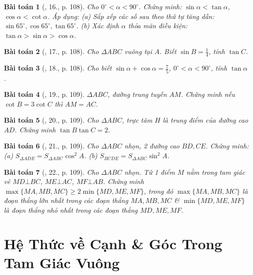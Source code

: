 \documentclass{article}
\newtheorem{baitoan}{Bài toán}
\begin{document}
\begin{baitoan}[\cite{Tuyen_Toan_9}, 16., p. 108]
	Cho $0^\circ < \alpha < 90^\circ$. Chứng minh: $\sin\alpha < \tan\alpha$, $\cos\alpha < \cot\alpha$. Áp dụng: (a) Sắp xếp các số sau theo thứ tự tăng dần: $\sin 65^\circ,\cos 65^\circ,\tan 65^\circ$. (b) Xác định $\alpha$ thỏa mãn điều kiện: $\tan\alpha > \sin\alpha > \cos\alpha$.
\end{baitoan}

\begin{baitoan}[\cite{Tuyen_Toan_9}, 17., p. 108]
	Cho $\Delta ABC$ vuông tại $A$. Biết $\sin B = \frac{1}{4}$, tính $\tan C$.
\end{baitoan}

\begin{baitoan}[\cite{Tuyen_Toan_9}, 18., p. 108]
	Cho biết $\sin\alpha + \cos\alpha = \frac{7}{5}$, $0^\circ < \alpha < 90^\circ$, tính $\tan\alpha$.
\end{baitoan}

\begin{baitoan}[\cite{Tuyen_Toan_9}, 19., p. 109]
	$\Delta ABC$, đường trung tuyến $AM$. Chứng minh nếu $\cot B = 3\cot C$ thì $AM = AC$.
\end{baitoan}

\begin{baitoan}[\cite{Tuyen_Toan_9}, 20., p. 109]
	Cho $\Delta ABC$, trực tâm $H$ là trung điểm của đường cao $AD$. Chứng minh $\tan B\tan C = 2$.
\end{baitoan}

\begin{baitoan}[\cite{Tuyen_Toan_9}, 21., p. 109]
	Cho $\Delta ABC$ nhọn, 2 đường cao $BD,CE$. Chứng minh: (a) $S_{\Delta ADE} = S_{\Delta ABC}\cos^2A$. (b) $S_{BCDE} = S_{\Delta ABC}\sin^2A$.
\end{baitoan}

\begin{baitoan}[\cite{Tuyen_Toan_9}, 22., p. 109]
	Cho $\Delta ABC$ nhọn. Từ 1 điểm $M$ nằm trong tam giác vẽ $MD\bot BC$, $ME\bot AC$, $MF\bot AB$. Chứng minh $\max\{MA,MB,MC\}\ge2\min\{MD,ME,MF\}$, trong đó $\max\{MA,MB,MC\}$ là đoạn thẳng lớn nhất trong các đoạn thẳng $MA,MB,MC$ \& $\min\{MD,ME,MF\}$ là đoạn thẳng nhỏ nhất trong các đoạn thẳng $MD,ME,MF$.
\end{baitoan}


\section{Hệ Thức về Cạnh \& Góc Trong Tam Giác Vuông}
\end{document}
